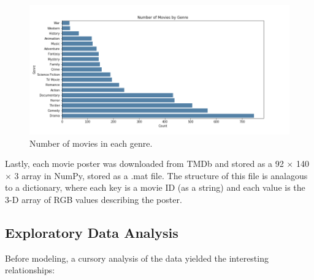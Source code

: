 \documentclass[12pt, oneside]{article}   	%
\begin{document}
\begin{figure}%
\includegraphics[width=\textwidth]{genre_barplot}
\caption{\label{fig:genre_barplot}Number of movies in each genre.}
\end{figure}

Lastly, each movie poster was downloaded from TMDb and stored as a 92 $\times$ 140 $\times$ 3 array in NumPy, stored as a .mat file. The structure of this file is analagous to a dictionary, where each key is a movie ID (as a string) and each value is the 3-D array of RGB values describing the poster.

\subsection{Exploratory Data Analysis}

Before modeling, a cursory analysis of the data yielded the interesting relationships:
\end{document}
